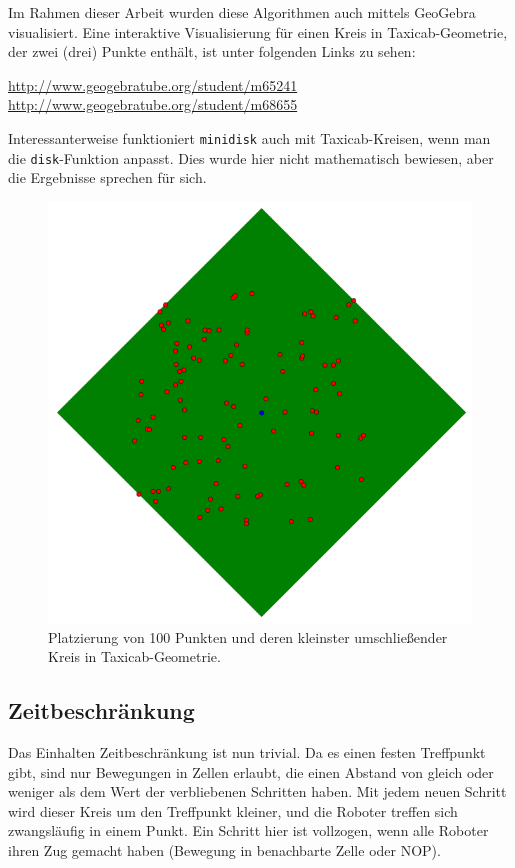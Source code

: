 \documentclass{article}
\begin{document}
Im Rahmen dieser Arbeit wurden diese Algorithmen auch mittels GeoGebra visualisiert. Eine interaktive Visualisierung
für einen Kreis in Taxicab-Geometrie, der zwei (drei) Punkte enthält, ist unter folgenden Links zu sehen: 

\url{http://www.geogebratube.org/student/m65241} \newline
\url{http://www.geogebratube.org/student/m68655}

Interessanterweise funktioniert \texttt{minidisk} auch mit Taxicab-Kreisen, wenn man die \texttt{disk}-Funktion anpasst. Dies wurde hier nicht mathematisch bewiesen, aber die Ergebnisse sprechen für sich.

\begin{figure}[!ht]
  \centering
  \includegraphics[width=.9\textwidth]{img/taxicab_minidisk.png}
  \caption{Platzierung von 100 Punkten und deren kleinster umschließender Kreis in Taxicab-Geometrie.}
  \label{img:taxicab_minidisk}
\end{figure}

\subsection{Zeitbeschränkung}

Das Einhalten Zeitbeschränkung ist nun trivial. Da es einen festen Treffpunkt gibt, sind nur Bewegungen in Zellen erlaubt, die einen 
Abstand von gleich oder weniger als dem Wert der verbliebenen Schritten haben. Mit jedem neuen Schritt wird dieser Kreis
um den Treffpunkt kleiner, und die Roboter treffen sich zwangsläufig in einem Punkt. Ein Schritt hier ist vollzogen, wenn alle Roboter ihren Zug gemacht haben (Bewegung in benachbarte Zelle oder NOP).
\end{document}
